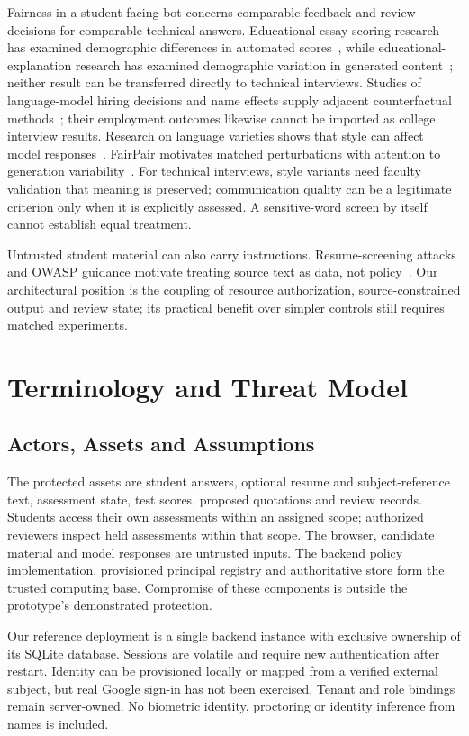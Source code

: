 \documentclass[conference]{IEEEtran}
\begin{document}
Fairness in a student-facing bot concerns comparable feedback and review decisions for comparable technical answers. Educational essay-scoring research has examined demographic differences in automated scores~\cite{kwako2024identity}, while educational-explanation research has examined demographic variation in generated content~\cite{weissburg2025teachers}; neither result can be transferred directly to technical interviews. Studies of language-model hiring decisions and name effects supply adjacent counterfactual methods~\cite{an2024discriminate,nghiem2024name}; their employment outcomes likewise cannot be imported as college interview results. Research on language varieties shows that style can affect model responses~\cite{fleisig2024linguistic}. FairPair motivates matched perturbations with attention to generation variability~\cite{dwivediyu2024fairpair}. For technical interviews, style variants need faculty validation that meaning is preserved; communication quality can be a legitimate criterion only when it is explicitly assessed. A sensitive-word screen by itself cannot establish equal treatment.

Untrusted student material can also carry instructions. Resume-screening attacks and OWASP guidance motivate treating source text as data, not policy~\cite{baxi2026prompt,owasp2025llm}. Our architectural position is the coupling of resource authorization, source-constrained output and review state; its practical benefit over simpler controls still requires matched experiments.

\section{Terminology and Threat Model}
\subsection{Actors, Assets and Assumptions}
The protected assets are student answers, optional resume and subject-reference text, assessment state, test scores, proposed quotations and review records. Students access their own assessments within an assigned scope; authorized reviewers inspect held assessments within that scope. The browser, candidate material and model responses are untrusted inputs. The backend policy implementation, provisioned principal registry and authoritative store form the trusted computing base. Compromise of these components is outside the prototype's demonstrated protection.

Our reference deployment is a single backend instance with exclusive ownership of its SQLite database. Sessions are volatile and require new authentication after restart. Identity can be provisioned locally or mapped from a verified external subject, but real Google sign-in has not been exercised. Tenant and role bindings remain server-owned. No biometric identity, proctoring or identity inference from names is included.
\end{document}
